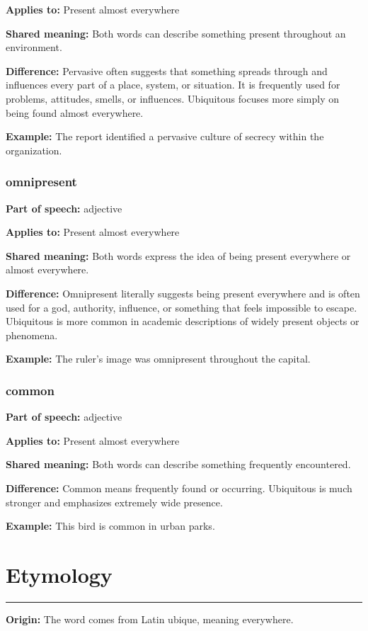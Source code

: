 \documentclass[11pt]{article}
\newcommand{\sectionrule}{\par\vspace{-0.5em}\noindent\textcolor{Accent}{\rule{\linewidth}{0.6pt}}\par}
\begin{document}
\textbf{Applies to:} Present almost everywhere

\textbf{Shared meaning:} Both words can describe something present throughout an environment.

\textbf{Difference:} Pervasive often suggests that something spreads through and influences every part of a place, system, or situation. It is frequently used for problems, attitudes, smells, or influences. Ubiquitous focuses more simply on being found almost everywhere.

\textbf{Example:} The report identified a pervasive culture of secrecy within the organization.

\subsubsection{omnipresent}
\textbf{Part of speech:} adjective

\textbf{Applies to:} Present almost everywhere

\textbf{Shared meaning:} Both words express the idea of being present everywhere or almost everywhere.

\textbf{Difference:} Omnipresent literally suggests being present everywhere and is often used for a god, authority, influence, or something that feels impossible to escape. Ubiquitous is more common in academic descriptions of widely present objects or phenomena.

\textbf{Example:} The ruler's image was omnipresent throughout the capital.

\subsubsection{common}
\textbf{Part of speech:} adjective

\textbf{Applies to:} Present almost everywhere

\textbf{Shared meaning:} Both words can describe something frequently encountered.

\textbf{Difference:} Common means frequently found or occurring. Ubiquitous is much stronger and emphasizes extremely wide presence.

\textbf{Example:} This bird is common in urban parks.

\section{Etymology}
\sectionrule
\textbf{Origin:} The word comes from Latin ubique, meaning everywhere.
\end{document}
